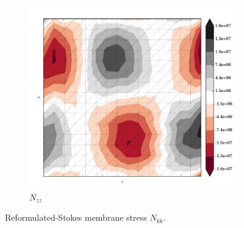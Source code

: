 \begin{figure}
  \begin{subfigure}[b]{0.3\linewidth}
    \includegraphics[width=\linewidth]{images/stress_balance/RS/N_zz.pdf}
  \caption{$N_{zz}$}
  \label{rs_N_zz}
  \end{subfigure}
 
  \caption[ISMIP-HOM reformulated-Stokes membrane stress]{Reformulated-Stokes membrane stress $N_{kk}$.}

  \label{rs_membrane_stress}

\end{figure}



